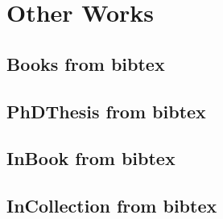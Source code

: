 \documentclass[a4paper]{article}
\newcommand{\su}[1]{\Shortunderstack[l]{#1}}
\begin{document}


\clearpage
\section{Other Works}

\clearpage
\subsection{Books from bibtex}


\clearpage
\subsection{PhDThesis from bibtex}


\clearpage



\clearpage
\subsection{InBook from bibtex}


\clearpage
\subsection{InCollection from bibtex}




\end{document}
